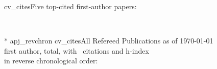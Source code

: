 \documentclass[12pt]{article}
\begin{document}

{cv_cites}{Five top-cited first-author  papers:}

\vfill  
\nopagebreak

\newpage

\nocite{bibc}{*}
{apj_revchron}
{cv_cites}{All Refereed Publications as of \today\\
\nfirst first author, \nrefereed total, with \ncitestotal\ citations and h-index \hindex\\
in reverse chronological order:}
%





%
\end{document}
